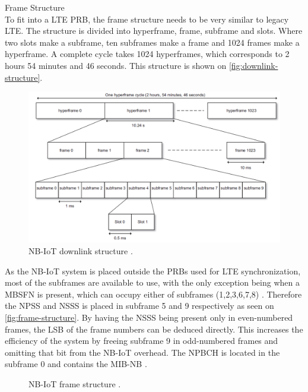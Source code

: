 Frame Structure\\
To fit into a \gls{LTE} \gls{PRB}, the frame structure needs to be very similar to legacy \gls{LTE}. The structure is divided into hyperframe, frame, subframe and slots. Where two slots make a subframe, ten subframes make a frame and 1024 frames make a hyperframe. A complete cycle takes 1024 hyperframes, which corresponds to 2 hours 54 minutes and 46 seconds. This structure is shown on \autoref{fig:downlink-structure}. \citep[ch. 7.2]{NB-IoT_Book}


\begin{figure}[H]
\centering
\includegraphics[width=\textwidth]{figures/downlink_structure_15kHz.png}
\caption{\gls{NB-IoT} downlink structure \citep[Fig. 7.7]{NB-IoT_Book}.}
\label{fig:downlink-structure}
\end{figure}


As the \gls{NB-IoT} system is placed outside the \gls{PRB}s used for LTE synchronization, most of the subframes are available to use, with the only exception being when a \gls{MBSFN} is present, which can occupy either of subframes (1,2,3,6,7,8) \citep{LTE-MBSFN}. Therefore the \gls{NPSS} and \gls{NSSS} is placed in subframe 5 and 9 respectively as seen on \autoref{fig:frame-structure}. By having the \gls{NSSS} being present only in even-numbered frames, the \gls{LSB} of the frame numbers can be deduced directly. This increases the efficiency of the system by freeing subframe 9 in odd-numbered frames and omitting that bit from the \gls{NB-IoT} overhead. The \gls{NPBCH} is located in the subframe 0 and contains the \gls{MIB-NB} \citep{REL-13}.  

\begin{figure}[H]
\centering

\caption{\gls{NB-IoT} frame structure \citep{REL-13}.}
\label{fig:frame-structure}
\end{figure}


